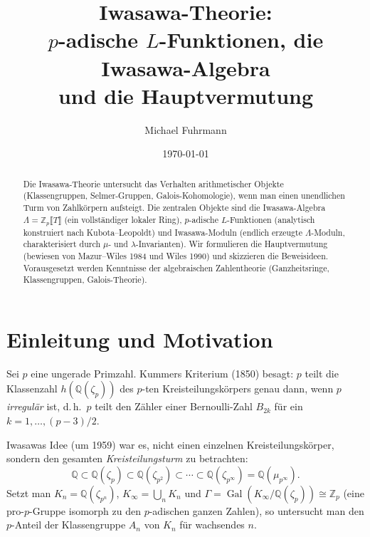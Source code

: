 \documentclass[12pt,a4paper]{amsart}
\theoremstyle{definition}
\newcommand{\Q}{\mathbb{Q}}
\newcommand{\Zp}{\mathbb{Z}_p}
\DeclareMathOperator{\Gal}{Gal}
\newcommand{\cylp}{\mathbb{Q}(\mu_{p^\infty})}
\begin{document}

\title{Iwasawa-Theorie:\\
       $p$-adische $L$-Funktionen, die Iwasawa-Algebra\\
       und die Hauptvermutung}

\author{Michael Fuhrmann}
\address{Specialist Mathematics Project, Build 119}
\date{\today}

\begin{abstract}
Die Iwasawa-Theorie untersucht das Verhalten arithmetischer Objekte
(Klassengruppen, Selmer-Gruppen, Galois-Kohomologie), wenn man einen
unendlichen Turm von Zahlkörpern aufsteigt.  Die zentralen Objekte sind
die Iwasawa-Algebra $\Lambda = \Zp\llbracket T \rrbracket$ (ein vollständiger
lokaler Ring), $p$-adische $L$-Funktionen (analytisch konstruiert nach
Kubota--Leopoldt) und Iwasawa-Moduln (endlich erzeugte $\Lambda$-Moduln,
charakterisiert durch $\mu$- und $\lambda$-Invarianten).
Wir formulieren die Hauptvermutung (bewiesen von Mazur--Wiles 1984 und
Wiles 1990) und skizzieren die Beweisideen.
Vorausgesetzt werden Kenntnisse der algebraischen Zahlentheorie
(Ganzheitsringe, Klassengruppen, Galois-Theorie).
\end{abstract}

\maketitle
\tableofcontents

\section{Einleitung und Motivation}

Sei $p$ eine ungerade Primzahl.  Kummers Kriterium (1850) besagt:
$p$ teilt die Klassenzahl $h(\Q(\zeta_p))$ des $p$-ten Kreisteilungskörpers
genau dann, wenn $p$ \emph{irregulär} ist, d.\,h.\ $p$ teilt den Zähler
einer Bernoulli-Zahl $B_{2k}$ für ein $k = 1, \ldots, (p-3)/2$.

Iwasawas Idee (um 1959) war es, nicht einen einzelnen Kreisteilungskörper,
sondern den gesamten \emph{Kreisteilungsturm} zu betrachten:
\[
  \Q \subset \Q(\zeta_p) \subset \Q(\zeta_{p^2}) \subset \cdots
  \subset \Q(\zeta_{p^\infty}) = \cylp.
\]
Setzt man $K_n = \Q(\zeta_{p^n})$, $K_\infty = \bigcup_n K_n$ und
$\Gamma = \Gal(K_\infty/\Q(\zeta_p)) \cong \Zp$ (eine pro-$p$-Gruppe
isomorph zu den $p$-adischen ganzen Zahlen), so untersucht man den
$p$-Anteil der Klassengruppe $A_n$ von $K_n$ für wachsendes $n$.
\end{document}
